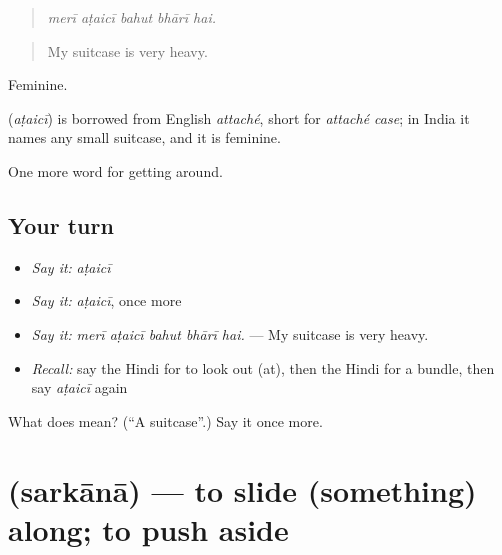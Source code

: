 \begin{quote}
    
\end{quote}

\begin{quote}
\emph{merī aṭaicī bahut bhārī hai.}
\end{quote}

\begin{quote}
My suitcase is very heavy.
\end{quote}

Feminine.

\begin{cousinweb}
\textbf{} (\emph{aṭaicī}) is borrowed from English \emph{attaché}, short for \emph{attaché case}; in India it names any small suitcase, and it is feminine.
\end{cousinweb}

\begin{grammarlens}[title={What you've built}]
One more word for getting around.
\end{grammarlens}

\subsection*{Your turn}
\begin{itemize}
\raggedright
  \item \emph{Say it:} \emph{aṭaicī}
  \item \emph{Say it:} \emph{aṭaicī}, once more
  \item \emph{Say it:} \emph{merī aṭaicī bahut bhārī hai.} — My suitcase is very heavy.
  \item \emph{Recall:} say the Hindi for to look out (at), then the Hindi for a bundle, then say \emph{aṭaicī} again
\end{itemize}

\begin{tcolorbox}[breakable,colback=teal!4,colframe=teal!35!black,title={Before you move on}]
What does  mean? (\textquotedblleft{}A suitcase\textquotedblright{}.) Say it once more.
\end{tcolorbox}
\section[\texorpdfstring{\hi{सरकाना} (sarkānā)}{सरकाना (sarkānā)}]{ (sarkānā) — to slide (something) along; to push aside}

\label{lesson:HI-C402-sarkana}



